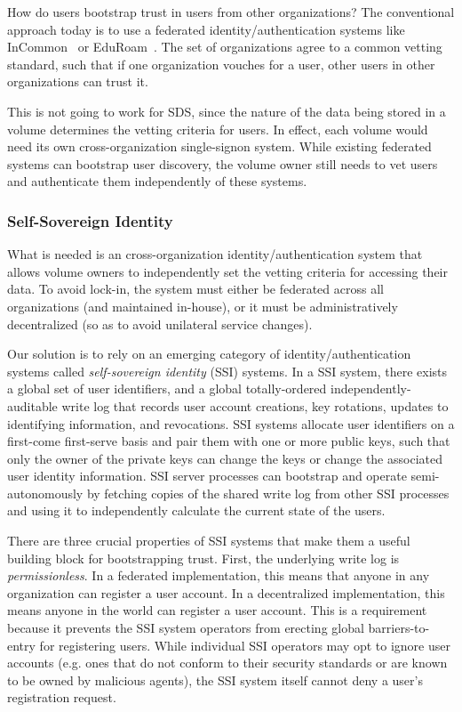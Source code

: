 How do users bootstrap trust in users from other organizations?
The conventional approach today is to use a federated
identity/authentication systems like InCommon~\cite{incommon} or EduRoam~\cite{eduroam}.
The set of organizations agree to a common vetting standard, such that if one
organization vouches for a user, other users in other organizations can trust
it.

This is not going to work for SDS, since the nature of the data being stored
in a volume determines the vetting criteria for users.  In effect, each volume
would need its own cross-organization single-signon system.  While existing
federated systems can bootstrap user discovery, the volume owner still
needs to vet users and authenticate them independently of these systems.

\subsubsection{Self-Sovereign Identity}

What is needed is an cross-organization identity/authentication system that
allows volume owners to independently set the vetting criteria for accessing their data.
To avoid lock-in, the system must either be federated across all organizations
(and maintained in-house), or it must be administratively decentralized (so as
to avoid unilateral service changes).

Our solution is to rely on an emerging category of identity/authentication
systems called \emph{self-sovereign identity} (SSI) systems.
In a SSI system, there exists a global set of user identifiers, and a global
totally-ordered independently-auditable write log that records user account creations, key rotations,
updates to identifying information, and revocations.  SSI systems 
allocate user identifiers on a first-come first-serve basis and pair them with
one or more public keys, such that only the owner of the private keys can 
change the keys or change the associated user identity information.  SSI
server processes can bootstrap and operate semi-autonomously by fetching copies
of the shared write log from other SSI processes and using it to independently
calculate the current state of the users.

There are three crucial properties of SSI systems that make them a useful
building block for bootstrapping trust.  First, the
underlying write log is \emph{permissionless}.  In a federated implementation,
this means that anyone in any organization can register a user account.  In a decentralized
implementation, this means anyone in the world can register a user account.  This is a
requirement because it prevents the SSI system operators from erecting global
barriers-to-entry for registering users.  While individual SSI operators
may opt to ignore user accounts (e.g. ones that do not conform to their security
standards or are known to be owned by malicious agents), the SSI system itself cannot
deny a user's registration request.

